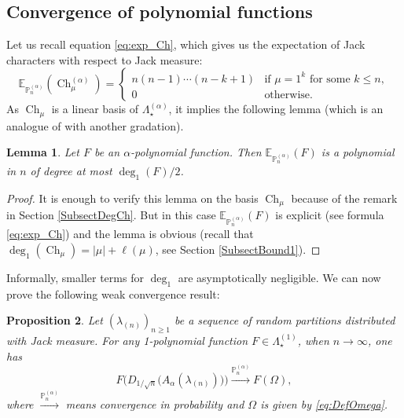 \documentclass[11pt]{amsart}
\theoremstyle{plain}
\newtheorem{lemma}{Lemma}[section]
\newtheorem{proposition}[lemma]{Proposition}
\theoremstyle{remark}
\newcommand{\PP}{\mathbb{P}}
\newcommand{\Pola}{\Lambda_\star^{(\alpha)}}
\newcommand{\Pol}{\Lambda_\star}
\newcommand{\esper}{\mathbb{E}}
\DeclareMathOperator{\Ch}{Ch}
\begin{document}
\subsection{Convergence of polynomial functions}
Let us recall equation \eqref{eq:exp_Ch},
which gives us the expectation of Jack characters with respect to Jack measure:
\begin{equation*}
    \esper_{\PP_n^{(\alpha)}}(\Ch^{(\alpha)}_\mu)=\begin{cases}
    n(n-1)\cdots(n-k+1) & \text{if }\mu=1^k \text{ for some }k \leq n,\\
    0   & \text{otherwise.}
\end{cases}
\end{equation*}
As $\Ch_\mu$ is a linear basis of $\Pola$, it implies the following lemma
(which is an analogue of \cite[Theorem 5.5]{OlshanskiJackPlancherel} with
another gradation).
\begin{lemma}
    Let $F$ be an $\alpha$-polynomial function. Then
$\esper_{\PP_n^{(\alpha)}}(F)$
    is a polynomial in $n$ of degree at most $\deg_1(F)/2$.
    \label{LemDegEsper}
\end{lemma}
\begin{proof}
    It is enough to verify this lemma on the basis $\Ch_\mu$ because
    of the remark in Section \ref{SubsectDegCh}.
    But in this case $\esper_{\PP_n^{(\alpha)}}(F)$
    is explicit (see formula \eqref{eq:exp_Ch}) and the lemma is obvious
    (recall that $\deg_1(\Ch_\mu)=|\mu|+\ell(\mu)$, see Section
    \ref{SubsectBound1}).
\end{proof}

Informally, smaller terms for $\deg_1$ are asymptotically negligible.
We can now prove the following weak convergence result:

\begin{proposition} \label{PropAPlanchWeakConv}
Let $(\lambda_{(n)})_{n \geq 1}$ be a sequence of random partitions 
distributed with Jack measure.
    For any 1-polynomial function $F \in \Pol^{(1)}$, when $n \to \infty$, one has
    \[ F\bigg(D_{1/\sqrt{n}} \big(A_\alpha(\lambda_{(n)})\big)\bigg) \xrightarrow{\PP_n^{(\alpha)}} 
    F( \Omega) , \]
    where $\xrightarrow{\PP_n^{(\alpha)}}$ means convergence in probability and $\Omega$ is given by \eqref{eq:DefOmega}.
\end{proposition}
\end{document}
